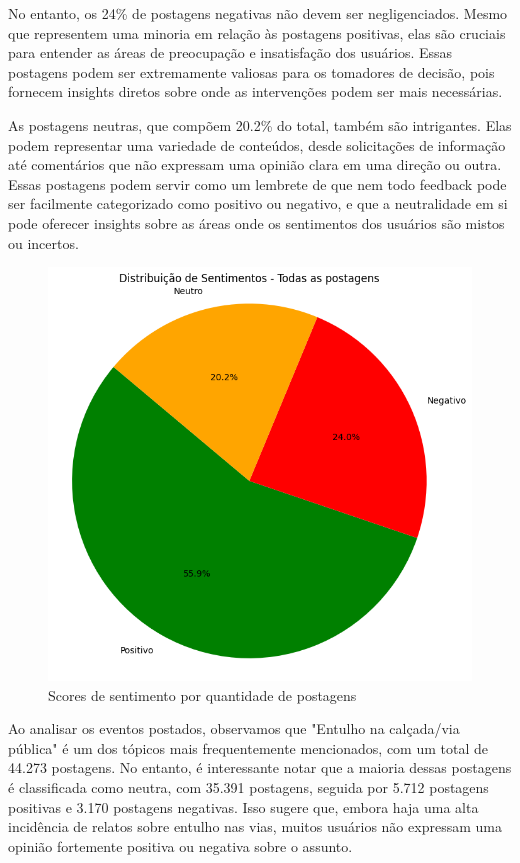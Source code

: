 No entanto, os 24\% de postagens negativas não devem ser negligenciados. Mesmo que representem uma minoria em relação às postagens positivas, elas são cruciais para entender as áreas de preocupação e insatisfação dos usuários. Essas postagens podem ser extremamente valiosas para os tomadores de decisão, pois fornecem insights diretos sobre onde as intervenções podem ser mais necessárias.

As postagens neutras, que compõem 20.2\% do total, também são intrigantes. Elas podem representar uma variedade de conteúdos, desde solicitações de informação até comentários que não expressam uma opinião clara em uma direção ou outra. Essas postagens podem servir como um lembrete de que nem todo feedback pode ser facilmente categorizado como positivo ou negativo, e que a neutralidade em si pode oferecer insights sobre as áreas onde os sentimentos dos usuários são mistos ou incertos.

\begin{figure}[!htb]
	\caption{Scores de sentimento por quantidade de postagens}
	\label{fig:pie_sentiment_breakdown}
	\centering
	\includegraphics[scale=0.7]{images/pie_sentiment_breakdown.png}
	\fautor
\end{figure}

Ao analisar os eventos postados, observamos que "Entulho na calçada/via pública" é um dos tópicos mais frequentemente mencionados, com um total de 44.273 postagens. No entanto, é interessante notar que a maioria dessas postagens é classificada como neutra, com 35.391 postagens, seguida por 5.712 postagens positivas e 3.170 postagens negativas. Isso sugere que, embora haja uma alta incidência de relatos sobre entulho nas vias, muitos usuários não expressam uma opinião fortemente positiva ou negativa sobre o assunto.

